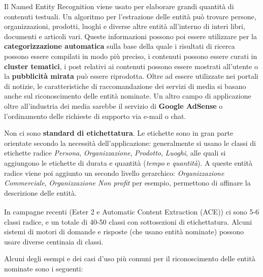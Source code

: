 Il Named Entity Recognition viene usato per elaborare grandi quantità di contenuti testuali. Un algoritmo per l’estrazione delle entità può trovare persone, organizzazioni, prodotti, luoghi e diverse altre entità all’interno di interi libri, documenti e articoli vari. Queste informazioni possono poi essere utilizzare per la \textbf{categorizzazione automatica} sulla base della quale i risultati di ricerca possono essere compilati in modo più preciso, i contenuti possono essere curati in \textbf{cluster tematici}, i post relativi ai contenuti possono essere mostrati all'utente o la \textbf{pubblicità mirata} può essere riprodotta. Oltre ad essere utilizzate nei portali di notizie, le caratteristiche di raccomandazione dei servizi di media si basano anche sul riconoscimento delle entità nominate. Un altro campo di applicazione oltre all'industria dei media sarebbe il servizio di \textbf{Google AdSense} o l'ordinamento delle richieste di supporto via e-mail o chat.

Non ci sono \textbf{standard di etichettatura}. Le etichette sono in gran parte orientate secondo la necessità dell'applicazione: generalmente si usano le classi di etichette radice \textit{Persona}, \textit{Organizzazione}, \textit{Prodotto}, \textit{Luoghi}, alle quali si aggiungono le etichette di durata e quantità (\textit{tempo} e \textit{quantità}). A queste entità radice viene poi aggiunto un secondo livello gerarchico: \textit{Organizzazione Commerciale}, \textit{Organizzazione Non profit} per esempio, permettono di affinare la descrizione delle entità. 

In campagne recenti (Ester 2\textsuperscript{\cite{Galliano09theester}} e Automatic Content Extraction (ACE)\textsuperscript{\cite{Doddington2004TheAC}}) ci sono 5-6 classi radice, e un totale di 40-50 classi con sottosezioni di etichettatura. Alcuni sistemi di motori di domande e risposte (che usano entità nominate) possono usare diverse centinaia di classi.

Alcuni degli esempi e dei casi d'uso più comuni per il riconoscimento delle entità nominate sono i seguenti:

